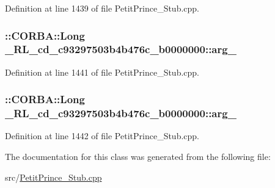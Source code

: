 Definition at line 1439 of file Petit\+Prince\+\_\+\+Stub.\+cpp.

\subsubsection[{\texorpdfstring{arg\+\_\+0}{arg_0}}]{\setlength{\rightskip}{0pt plus 5cm}\+::C\+O\+R\+B\+A\+::\+Long \+\_\+R\+L\+\_\+cd\+\_\+c93297503b4b476c\+\_\+b0000000\+::arg\+\_}\hypertarget{class__0_r_l__cd__c93297503b4b476c__b0000000_ae90df0f02cbdd0ef4f1add610ebd2118}{}\label{class__0_r_l__cd__c93297503b4b476c__b0000000_ae90df0f02cbdd0ef4f1add610ebd2118}


Definition at line 1441 of file Petit\+Prince\+\_\+\+Stub.\+cpp.

\subsubsection[{\texorpdfstring{arg\+\_\+1}{arg_1}}]{\setlength{\rightskip}{0pt plus 5cm}\+::C\+O\+R\+B\+A\+::\+Long \+\_\+R\+L\+\_\+cd\+\_\+c93297503b4b476c\+\_\+b0000000\+::arg\+\_}\hypertarget{class__0_r_l__cd__c93297503b4b476c__b0000000_a02271bbb9282eb05747774e2e14e7ffb}{}\label{class__0_r_l__cd__c93297503b4b476c__b0000000_a02271bbb9282eb05747774e2e14e7ffb}


Definition at line 1442 of file Petit\+Prince\+\_\+\+Stub.\+cpp.



The documentation for this class was generated from the following file\+:\begin{DoxyCompactItemize}
\item 
src/\hyperlink{_petit_prince___stub_8cpp}{Petit\+Prince\+\_\+\+Stub.\+cpp}\end{DoxyCompactItemize}
